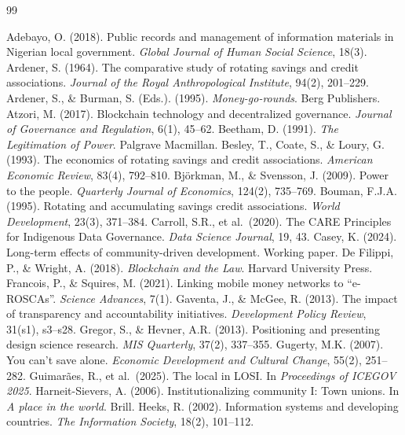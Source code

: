 \documentclass[sigconf]{acmart}
\begin{document}
\begin{thebibliography}{99}

 Adebayo, O. (2018). Public records and management of information materials in Nigerian local government. \textit{Global Journal of Human Social Science}, 18(3).
 Ardener, S. (1964). The comparative study of rotating savings and credit associations. \textit{Journal of the Royal Anthropological Institute}, 94(2), 201--229.
 Ardener, S., \& Burman, S. (Eds.). (1995). \textit{Money-go-rounds}. Berg Publishers.
 Atzori, M. (2017). Blockchain technology and decentralized governance. \textit{Journal of Governance and Regulation}, 6(1), 45--62.
 Beetham, D. (1991). \textit{The Legitimation of Power}. Palgrave Macmillan.
 Besley, T., Coate, S., \& Loury, G. (1993). The economics of rotating savings and credit associations. \textit{American Economic Review}, 83(4), 792--810.
 Bj\"{o}rkman, M., \& Svensson, J. (2009). Power to the people. \textit{Quarterly Journal of Economics}, 124(2), 735--769.
 Bouman, F.J.A. (1995). Rotating and accumulating savings credit associations. \textit{World Development}, 23(3), 371--384.
 Carroll, S.R., et al.\ (2020). The CARE Principles for Indigenous Data Governance. \textit{Data Science Journal}, 19, 43.
 Casey, K. (2024). Long-term effects of community-driven development. Working paper.
 De Filippi, P., \& Wright, A. (2018). \textit{Blockchain and the Law}. Harvard University Press.
 Francois, P., \& Squires, M. (2021). Linking mobile money networks to ``e-ROSCAs''. \textit{Science Advances}, 7(1).
 Gaventa, J., \& McGee, R. (2013). The impact of transparency and accountability initiatives. \textit{Development Policy Review}, 31(s1), s3--s28.
 Gregor, S., \& Hevner, A.R. (2013). Positioning and presenting design science research. \textit{MIS Quarterly}, 37(2), 337--355.
 Gugerty, M.K. (2007). You can't save alone. \textit{Economic Development and Cultural Change}, 55(2), 251--282.
 Guimar\~{a}es, R., et al.\ (2025). The local in LOSI. In \textit{Proceedings of ICEGOV 2025}.
 Harneit-Sievers, A. (2006). Institutionalizing community I: Town unions. In \textit{A place in the world}. Brill.
 Heeks, R. (2002). Information systems and developing countries. \textit{The Information Society}, 18(2), 101--112.

\end{thebibliography}
\end{document}
